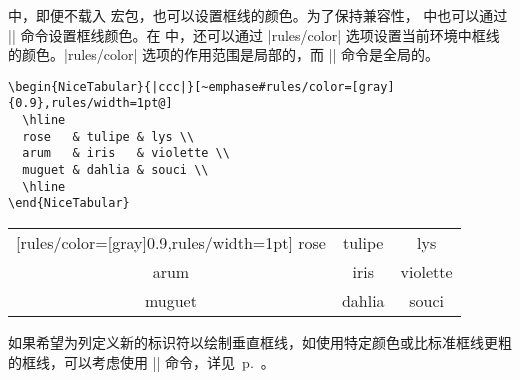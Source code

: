 \documentclass[dvipsnames]{article}%
\begin{document}
 中，即便不载入  宏包，也可以设置框线的颜色。为了保持兼容性， 中也可以通过 |\arrayrulecolor| 命令设置框线颜色。在  中，还可以通过 |rules/color| 选项设置当前环境中框线的颜色。|rules/color| 选项的作用范围是局部的，而 |\arrayrulecolor| 命令是全局的。

\bigskip
\begin{scope}
\hfuzz=10cm
\begin{BVerbatim}[baseline=c,boxwidth=9.5cm]
\begin{NiceTabular}{|ccc|}[~emphase#rules/color=[gray]{0.9},rules/width=1pt@]
  \hline
  rose   & tulipe & lys \\
  arum   & iris   & violette \\
  muguet & dahlia & souci \\
  \hline
\end{NiceTabular}
\end{BVerbatim}
\begin{NiceTabular}{|ccc|}[rules/color=[gray]{0.9},rules/width=1pt]
\hline
rose & tulipe & lys \\
arum & iris & violette \\
muguet & dahlia & souci \\
\hline
\end{NiceTabular}
\end{scope}

\medskip
如果希望为列定义新的标识符以绘制垂直框线，如使用特定颜色或比标准框线更粗的框线，可以考虑使用 |\OnlyMainNiceMatrix| 命令，详见~p.~\pageref{OnlyMainNiceMatrix}。


\end{document}
